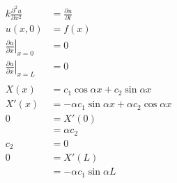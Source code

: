 \documentclass{article}
\begin{document}
\begin{align*}
  k \frac{\partial^2 u}{\partial x^2}                  & = \frac{\partial u}{\partial t}                                                                                                                      \\
  u(x, 0)                                              & = f(x)                                                                                                                                               \\
  \left. \frac{\partial u}{\partial x} \right|_{x = 0} & = 0                                                                                                                                                  \\
  \left. \frac{\partial u}{\partial x} \right|_{x = L} & = 0                                                                                                                                                  \\ \\
  X(x)                                                 & = c_1 \cos \alpha x + c_2 \sin \alpha x                                                                                                              \\
  X'(x)                                                & = -\alpha c_1 \sin \alpha x + \alpha c_2 \cos \alpha x                                                                                               \\
  0                                                    & = X'(0)                                                                                                                                              \\
                                                       & = \alpha c_2                                                                                                                                         \\
  c_2                                                  & = 0                                                                                                                                                  \\
  0                                                    & = X'(L)                                                                                                                                              \\
                                                       & = -\alpha c_1 \sin \alpha L                                                                                                                          \\

\end{align*}
\end{document}
